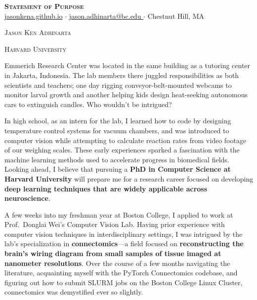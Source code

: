 \documentclass[letterpaper,11pt]{article}
\newcommand{\dualsectionold}[2]{%
  \noindent
    \parbox[b]{0.5\textwidth}{\raggedright\scshape\large #1}%
    \hfill
    \parbox[b]{0.5\textwidth}{\raggedleft\scshape\large #2}%
}
\newcommand{\dualsectionhline}{%
  \vspace{2pt}\color{black}\titlerule\vspace{-5pt}
}
\newcommand{\dualsection}[2]{%
  \dualsectionold{#1}{#2}%
  \vspace{-5pt}\dualsectionhline
}
\begin{document}
\justifying

\begin{center}
  \textbf{\Huge \scshape Statement of Purpose} \\ \vspace{3pt}
    \small
    \href{https://jasonkena.github.io}{jasonkena.github.io}
   \hspace{0.05cm}$\cdot$\hspace{0.05cm}
    \href{mailto:jason.adhinarta@bc.edu}{ jason.adhinarta@bc.edu }
   \hspace{0.05cm}$\cdot$\hspace{0.05cm}
    Chestnut Hill, MA
\end{center}


\dualsection{Jason Ken Adhinarta}{Harvard University}
\vspace{2pt}\color{black}\titlerule%

Emmerich Research Center was located in the same building as a tutoring center in Jakarta, Indonesia. The lab members there juggled responsibilities as both scientists and teachers; one day rigging conveyor-belt-mounted webcams to monitor larval growth and another helping kids design heat-seeking autonomous cars to extinguish candles. Who wouldn't be intrigued?

In high school, as an intern for the lab, I learned how to code by designing temperature control systems for vacuum chambers, and was introduced to computer vision while attempting to calculate reaction rates from video footage of our weighing scales. These early experiences sparked a fascination with the machine learning methods used to accelerate progress in biomedical fields. Looking ahead, I believe that pursuing a \textbf{PhD in Computer Science at Harvard University} will prepare me for a research career focused on developing \textbf{deep learning techniques that are widely applicable across neuroscience}.

A few weeks into my freshman year at Boston College, I applied to work at Prof.\ Donglai Wei’s Computer Vision Lab. Having prior experience with computer vision techniques in interdisciplinary settings, I was intrigued by the lab’s specialization in \textbf{connectomics}---a field focused on \textbf{reconstructing the brain’s wiring diagram from small samples of tissue imaged at nanometer resolutions}. Over the course of a few months navigating the literature, acquainting myself with the PyTorch Connectomics codebase, and figuring out how to submit SLURM jobs on the Boston College Linux Cluster, connectomics was demystified ever so slightly.
\end{document}
